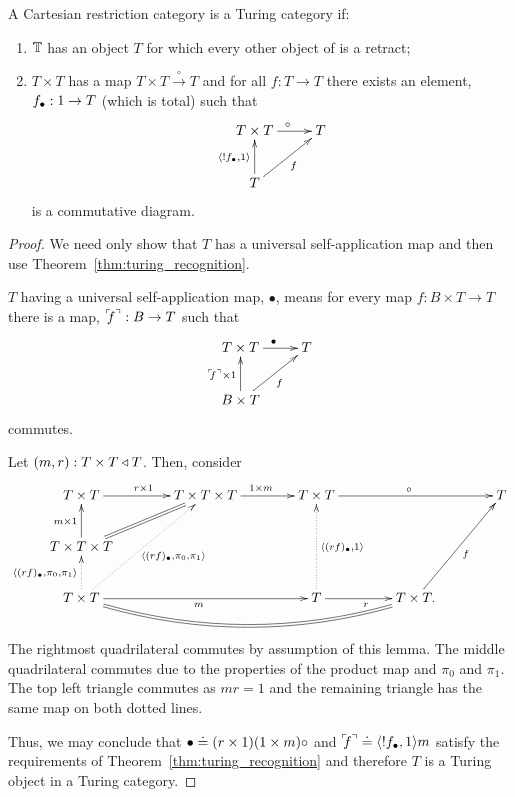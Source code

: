 \begin{lemma}\label{lem:t_t_to_t_gives_a_turing_category}
  A Cartesian restriction category \T is a Turing category if:
  \begin{enumerate}[{(}i{)}]
  \item $\mathbb{T}$ has an object $T$ for which every other object of \D is a retract;
  \item $T\times T$ has a map  $T\times T \xrightarrow{\ \circ\ }T$ and for all
    $f:T\to T$ there exists an element, $f_{\bullet}:1\to T$ (which is total) such that
      \[
        \xymatrix{
          T\times T \ar[r]^{\circ} & T \\
          T \ar[ur]_{f} \ar[u]^{\<!\code{f},1\>}
        }
      \]
    is a commutative diagram.
  \end{enumerate}
\end{lemma}
\begin{proof}
  We need only show that $T$ has a universal self-application map and then use
  Theorem~\ref{thm:turing_recognition}.

  $T$ having a universal self-application map, $\bullet$, means for every map $f:B\times T \to T$ there is a
  map, ${}^\ulcorner\!\!f^\urcorner:B\to T$ such that
  \[
    \xymatrix{
      T\times T \ar[r]^{\bullet} & T \\
      B\times T \ar[ur]_{f} \ar[u]^{\name{f}\times1}
    }
  \]
  commutes.

  Let $(m,r):T\times T\triangleleft T$. Then, consider
  \[
    \xymatrix@C+15pt{
     T\times T \ar[r]^{r\times 1} & T\times T\times T \ar[r]^{1\times m} &T\times T \ar[rr]^{\circ}
       && T \\
     T\times T\times T \ar[u]^{m\times 1} \ar@{=}[ur]\\
     T\times T \ar@{.>}[u]^{\<\code{(rf)},\pi_0,\pi_1\>} \ar@{.>}[uur]_{\<\code{(rf)},\pi_0,\pi_1\>}
       \ar[rr]_{m} \ar@{=}@/_20pt/[rrr]
       & & T \ar[r]_{r} \ar@{.>}[uu]_{\<\code{(rf)},1\>} &T\times T. \ar[uur]_{f}
    }
  \]
  \\[10pt]
  The rightmost quadrilateral commutes by assumption of this lemma. The middle quadrilateral
  commutes due to the properties of the product map and $\pi_0$ and $\pi_1$. The top left triangle
  commutes as $m r = 1$ and the remaining triangle has the same map on both dotted lines.

  Thus, we may conclude that $\bullet \doteq (r \times 1)(1\times m) \circ$ and
  ${}^\ulcorner\!\!f^\urcorner\doteq \langle!f_{\bullet},1\rangle m$ satisfy the requirements of
  Theorem~\ref{thm:turing_recognition} and therefore $T$ is a Turing object in a Turing category.
\end{proof}

